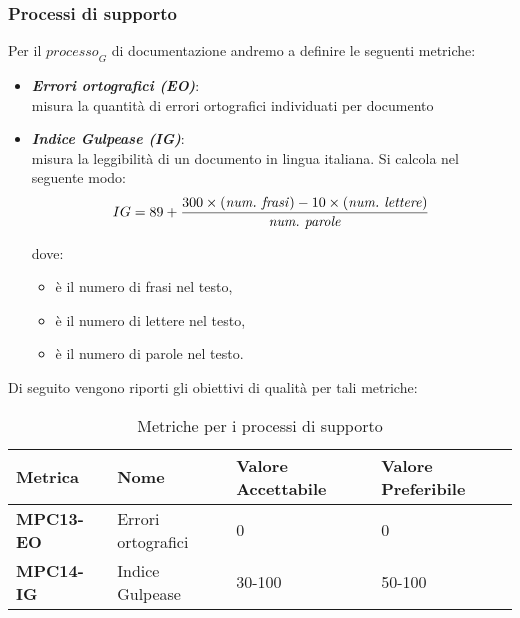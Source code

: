 \subsubsection{Processi di supporto}
Per il $\textit{processo}_G$ di documentazione andremo a definire le seguenti metriche:
\begin{itemize}
    \item \textbf{\emph{Errori ortografici (EO)}}:\\
    misura la quantità di errori ortografici individuati per documento
    \item \textbf{\emph{Indice Gulpease (IG)}}:\\
    misura la leggibilità di un documento in lingua italiana. Si calcola nel seguente modo:
    \[
    IG = 89 + \frac{300 \times (\text{{\emph{num.\ frasi}}}) - 10 \times (\text{\emph{{num.\ lettere}}})}{\text{\emph{{num.\ parole}}}}
    \]

    dove:
    \begin{itemize}
        \item {} \`e il numero di frasi nel testo,
        \item {} \`e il numero di lettere nel testo,
        \item {} \`e il numero di parole nel testo.
    \end{itemize}
    \end{itemize}
Di seguito vengono riporti gli obiettivi di qualità per tali metriche:
\begin{table}[htbp]
    \centering
    \begin{tabular}{|>{\centering\arraybackslash}p{4cm}|p{4cm}|p{4cm}|p{4cm}|}
    \hline
    \rowcolor{gray!30}
    \textbf{Metrica} & \textbf{Nome} & \textbf{Valore Accettabile} & \textbf{Valore Preferibile} \\
    \hline
    \rowcolor{gray!10}
    \textbf{MPC13-EO} & Errori ortografici & 0 & 0 \\
    \hline
    \rowcolor{gray!10}
    \textbf{MPC14-IG} & Indice Gulpease & 30-100 & 50-100 \\
    \hline
    \end{tabular}
    \caption{Metriche per i processi di supporto}
    \label{tab:metriche_fornitura}
\end{table}
\newpage
